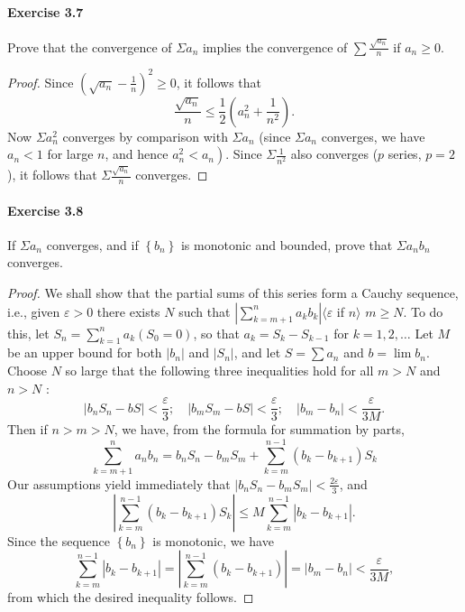 \documentclass{article}
\theoremstyle{definition}
\begin{document}
\paragraph{Exercise 3.7} Prove that the convergence of $\Sigma a_{n}$ implies the convergence of $\sum \frac{\sqrt{a_{n}}}{n}$ if $a_n\geq 0$.
\begin{proof}
    Since $\left(\sqrt{a_n}-\frac{1}{n}\right)^2 \geq 0$, it follows that
$$
\frac{\sqrt{a_n}}{n} \leq \frac{1}{2}\left(a_n^2+\frac{1}{n^2}\right) .
$$
Now $\Sigma a_n^2$ converges by comparison with $\Sigma a_n$ (since $\Sigma a_n$ converges, we have $a_n<1$ for large $n$, and hence $\left.a_n^2<a_n\right)$. Since $\Sigma \frac{1}{n^2}$ also converges ($p$ series, $p=2$ ), it follows that $\Sigma \frac{\sqrt{a_n}}{n}$ converges.
\end{proof}



\paragraph{Exercise 3.8} If $\Sigma a_{n}$ converges, and if $\left\{b_{n}\right\}$ is monotonic and bounded, prove that $\Sigma a_{n} b_{n}$ converges.
\begin{proof}
    We shall show that the partial sums of this series form a Cauchy sequence, i.e., given $\varepsilon>0$ there exists $N$ such that $\left|\sum_{k=m+1}^n a_k b_k\right|\langle\varepsilon$ if $n\rangle$ $m \geq N$. To do this, let $S_n=\sum_{k=1}^n a_k\left(S_0=0\right)$, so that $a_k=S_k-S_{k-1}$ for $k=1,2, \ldots$ Let $M$ be an upper bound for both $\left|b_n\right|$ and $\left|S_n\right|$, and let $S=\sum a_n$ and $b=\lim b_n$. Choose $N$ so large that the following three inequalities hold for all $m>N$ and $n>N$ :
$$
\left|b_n S_n-b S\right|<\frac{\varepsilon}{3} ; \quad\left|b_m S_m-b S\right|<\frac{\varepsilon}{3} ; \quad\left|b_m-b_n\right|<\frac{\varepsilon}{3 M} .
$$
Then if $n>m>N$, we have, from the formula for summation by parts,
$$
\sum_{k=m+1}^n a_n b_n=b_n S_n-b_m S_m+\sum_{k=m}^{n-1}\left(b_k-b_{k+1}\right) S_k
$$
Our assumptions yield immediately that $\left|b_n S_n-b_m S_m\right|<\frac{2 \varepsilon}{3}$, and
$$
\left|\sum_{k=m}^{n-1}\left(b_k-b_{k+1}\right) S_k\right| \leq M \sum_{k=m}^{n-1}\left|b_k-b_{k+1}\right| .
$$
Since the sequence $\left\{b_n\right\}$ is monotonic, we have
$$
\sum_{k=m}^{n-1}\left|b_k-b_{k+1}\right|=\left|\sum_{k=m}^{n-1}\left(b_k-b_{k+1}\right)\right|=\left|b_m-b_n\right|<\frac{\varepsilon}{3 M},
$$
from which the desired inequality follows.
\end{proof}
\end{document}
